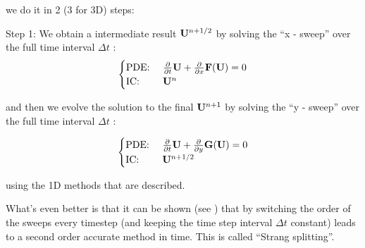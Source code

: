 we do it in 2 (3 for 3D) steps:

Step 1: We obtain a intermediate result $\mathbf{U}^{n+1/2}$ by solving the ``x - sweep'' over the full time interval $\Delta t$ :
\begin{equation}
	\begin{cases}
		\text{PDE: } & \frac{\partial}{\partial t}{\mathbf{U}} + \frac{\partial}{\partial x}{\mathbf{F}(\mathbf{U})} = 0\\
		\text{IC: } &  \mathbf{U}^n
	\end{cases}
\end{equation}

and then we evolve the solution to the final $\mathbf{U}^{n+1}$ by solving the ``y - sweep'' over the full time interval $\Delta t$ :

\begin{equation}
	\begin{cases}
		\text{PDE: } & \frac{\partial}{\partial t}{\mathbf{U}} + \frac{\partial}{\partial y} \mathbf{G}(\mathbf{U}) = 0\\
		\text{IC: } & \mathbf{U}^{n+1/2} \\
	\end{cases}
\end{equation}

using the 1D methods that are described.

What's even better is that it can be shown (see \cite{leveque_2002}) that by switching the order of the sweeps every timestep (and keeping the time step interval $\Delta t$ constant) leads to a second order accurate method in time.
This is called ``Strang splitting''.
















